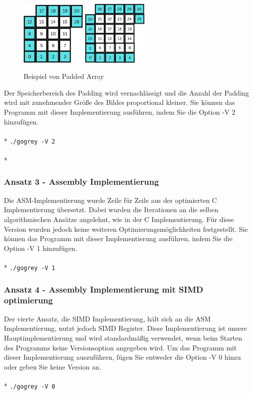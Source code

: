 \documentclass[course=asp]{aspdoc}
\begin{document}
\begin{figure}[h]
    \centering
    \includegraphics[width=3.2cm]{graphics/padded array 1.png}
    \quad
    \includegraphics[width=3.2cm]{graphics/padded array 2.png}
    \caption{Beispiel von Padded Array}
    \label{fig:my_label}
\end{figure}

Der Speicherbereich des Padding wird vernachlässigt und die Anzahl der Padding wird mit zunehmender Größe des Bildes proportional kleiner. Sie können das Programm mit dieser Implementierung ausführen, indem Sie die Option -V 2 hinzufügen.\\
\\*
\texttt{./gogrey -V 2}\\
\\*

\subsubsection{Ansatz 3 - Assembly Implementierung}
Die ASM-Implementierung wurde Zeile für Zeile aus der optimierten C Implementierung übersetzt. Dabei wurden die Iterationen an die selben algorithmischen Ansätze angelehnt, wie in der C Implementierung. Für diese Version wurden jedoch keine weiteren Optimierungsmöglichkeiten festgestellt. Sie können das Programm mit dieser Implementierung ausführen, indem Sie die Option -V 1 hinzufügen.\\
\\*
\texttt{./gogrey -V 1}\\

\subsubsection{Ansatz 4 - Assembly Implementierung mit SIMD optimierung}
Der vierte Ansatz, die SIMD Implementierung, hält sich an die ASM Implementierung, nutzt jedoch SIMD Register. Diese Implementierung ist unsere Hauptimplementierung und wird standardmäßig verwendet, wenn beim Starten des Programms keine Versionsoption angegeben wird. Um das Programm mit dieser Implementierung auszuführen, fügen Sie entweder die Option -V 0 hinzu oder geben Sie keine Version an.\\
\\*
\texttt{./gogrey -V 0}\\
\end{document}
